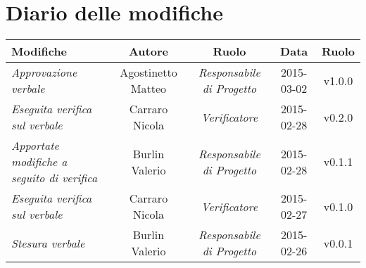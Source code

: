 \newpage
\section*{Diario delle modifiche}

\begin{table}[h]
\centering
\begin{tabular}{|p{}|c|c|c|c|}
	\toprule
		\textbf{Modifiche} & \textbf{Autore} & \textbf{Ruolo} & \textbf{Data} & \textbf{Ruolo} \\
	\midrule
	\midrule
		\textit{Approvazione verbale} & Agostinetto Matteo & \textit{Responsabile di Progetto} & 2015-03-02 & v1.0.0 \\
	\midrule
		\textit{Eseguita verifica sul verbale} & Carraro Nicola & \textit{Verificatore} & 2015-02-28 & v0.2.0 \\
	\midrule
		\textit{Apportate modifiche a seguito di verifica} & Burlin Valerio & \textit{Responsabile di Progetto} & 2015-02-28 & v0.1.1 \\
	\midrule
		\textit{Eseguita verifica sul verbale} & Carraro Nicola & \textit{Verificatore} & 2015-02-27 & v0.1.0 \\
	\midrule
		\textit{Stesura verbale} & Burlin Valerio & \textit{Responsabile di Progetto} & 2015-02-26 & v0.0.1 \\
	\bottomrule
\end{tabular}	
\end{table}

\newpage